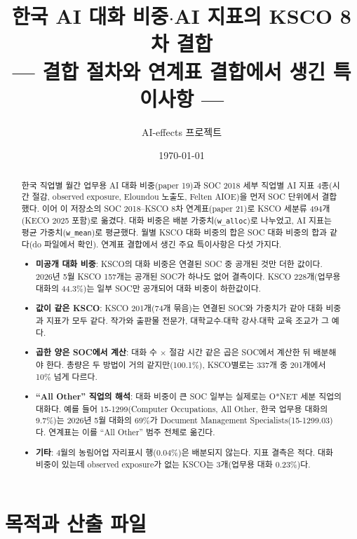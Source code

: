 \documentclass[11pt]{article}
\title{한국 AI 대화 비중$\cdot$AI 지표의 KSCO 8차 결합\\[2mm]
\large --- 결합 절차와 연계표 결합에서 생긴 특이사항 ---}
\author{AI-effects 프로젝트}
\date{\today}
\begin{document}
\maketitle

\begin{abstract}
\noindent 한국 직업별 월간 업무용 AI 대화 비중(paper 19)과 SOC 2018 세부 직업별 AI 지표 4종(시간 절감, observed exposure, Eloundou 노출도, Felten AIOE)을 먼저 SOC 단위에서 결합했다. 이어 이 저장소의 SOC 2018–KSCO 8차 연계표(paper 21)로 KSCO 세분류 494개(KECO 2025 포함)로 옮겼다. 대화 비중은 배분 가중치(\texttt{w\_alloc})로 나누었고, AI 지표는 평균 가중치(\texttt{w\_mean})로 평균했다. 월별 KSCO 대화 비중의 합은 SOC 대화 비중의 합과 같다(do 파일에서 확인). 연계표 결합에서 생긴 주요 특이사항은 다섯 가지다.
\begin{itemize}[leftmargin=*]
  \item \textbf{미공개 대화 비중}: KSCO의 대화 비중은 연결된 SOC 중 공개된 것만 더한 값이다. 2026년 5월 KSCO 157개는 공개된 SOC가 하나도 없어 결측이다. KSCO 228개(업무용 대화의 44.3\%)는 일부 SOC만 공개되어 대화 비중이 하한값이다.
  \item \textbf{값이 같은 KSCO}: KSCO 201개(74개 묶음)는 연결된 SOC와 가중치가 같아 대화 비중과 지표가 모두 같다. 작가와 출판물 전문가, 대학교수$\cdot$대학 강사$\cdot$대학 교육 조교가 그 예다.
  \item \textbf{곱한 양은 SOC에서 계산}: 대화 수 $\times$ 절감 시간 같은 곱은 SOC에서 계산한 뒤 배분해야 한다. 총량은 두 방법이 거의 같지만(100.1\%), KSCO별로는 337개 중 201개에서 10\% 넘게 다르다.
  \item \textbf{``All Other'' 직업의 해석}: 대화 비중이 큰 SOC 일부는 실제로는 O*NET 세분 직업의 대화다. 예를 들어 15-1299(Computer Occupations, All Other, 한국 업무용 대화의 9.7\%)는 2026년 5월 대화의 69\%가 Document Management Specialists(15-1299.03)다. 연계표는 이를 ``All Other'' 범주 전체로 옮긴다.
  \item \textbf{기타}: 4월의 농림어업 자리표시 행(0.04\%)은 배분되지 않는다. 지표 결측은 적다. 대화 비중이 있는데 observed exposure가 없는 KSCO는 3개(업무용 대화 0.23\%)다.
\end{itemize}
\end{abstract}

\tableofcontents

\section{목적과 산출 파일}
\end{document}

